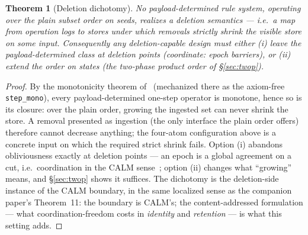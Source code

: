 \documentclass[11pt]{article}
\newtheorem{theorem}{Theorem}
\theoremstyle{definition}
\theoremstyle{remark}
\begin{document}
%
%
%
%


\begin{theorem}[Deletion dichotomy]\label{thm:dichotomy}
No payload-determined rule system, operating over the plain subset order on seeds, realizes a deletion semantics --- i.e.\ a map from operation logs to stores under which removals strictly shrink the visible store on some input. Consequently any deletion-capable design must either (i) leave the payload-determined class at deletion points (\emph{coordinate}: epoch barriers), or (ii) extend the order on states (\emph{the two-phase product order of \S\ref{sec:twop}}).
\end{theorem}

\begin{proof}
By the monotonicity theorem of~\cite{growth} (mechanized there as the axiom-free \texttt{step\_mono}), every payload-determined one-step operator is monotone, hence so is its closure: over the plain order, growing the ingested set can never shrink the store. A removal presented as ingestion (the only interface the plain order offers) therefore cannot decrease anything; the four-atom configuration above is a concrete input on which the required strict shrink fails. Option (i) abandons obliviousness exactly at deletion points --- an epoch is a global agreement on a cut, i.e.\ coordination in the CALM sense~\cite{Hellerstein10,AmelootNV13}; option (ii) changes what ``growing'' means, and \S\ref{sec:twop} shows it suffices. The dichotomy is the deletion-side instance of the CALM boundary, in the same localized sense as the companion paper's Theorem~11: the boundary is CALM's; the content-addressed formulation --- what coordination-freedom costs in \emph{identity} and \emph{retention} --- is what this setting adds.
\end{proof}
\end{document}
